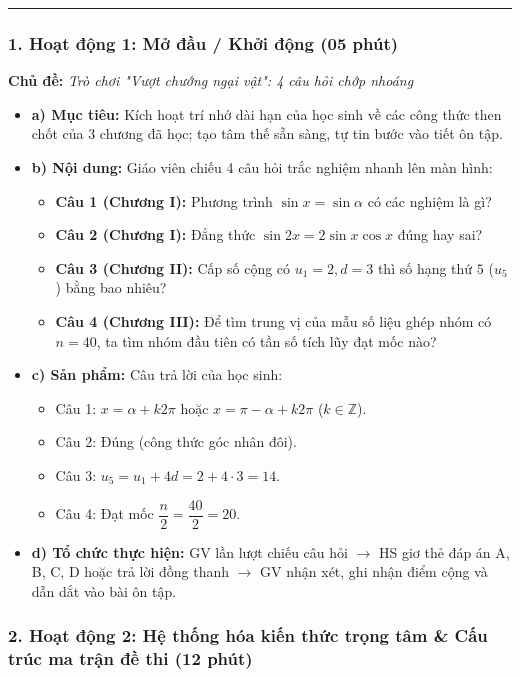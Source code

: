 \documentclass[12pt, a4paper]{article}
\begin{document}
\vspace{0.8em}
\hrule
\vspace{0.8em}

\subsubsection*{1. Hoạt động 1: Mở đầu / Khởi động (05 phút)}
\textbf{Chủ đề:} \textit{Trò chơi "Vượt chướng ngại vật": 4 câu hỏi chớp nhoáng}
\begin{itemize}
    \item \textbf{a) Mục tiêu:} Kích hoạt trí nhớ dài hạn của học sinh về các công thức then chốt của 3 chương đã học; tạo tâm thế sẵn sàng, tự tin bước vào tiết ôn tập.
    \item \textbf{b) Nội dung:} Giáo viên chiếu 4 câu hỏi trắc nghiệm nhanh lên màn hình:
    \begin{itemize}
        \item \textbf{Câu 1 (Chương I):} Phương trình $\sin x = \sin \alpha$ có các nghiệm là gì?
        \item \textbf{Câu 2 (Chương I):} Đẳng thức $\sin 2x = 2\sin x \cos x$ đúng hay sai?
        \item \textbf{Câu 3 (Chương II):} Cấp số cộng có $u_1 = 2, d = 3$ thì số hạng thứ $5$ ($u_5$) bằng bao nhiêu?
        \item \textbf{Câu 4 (Chương III):} Để tìm trung vị của mẫu số liệu ghép nhóm có $n = 40$, ta tìm nhóm đầu tiên có tần số tích lũy đạt mốc nào?
    \end{itemize}
    \item \textbf{c) Sản phẩm:} Câu trả lời của học sinh:
    \begin{itemize}
        \item Câu 1: $x = \alpha + k2\pi$ hoặc $x = \pi - \alpha + k2\pi$ ($k \in \mathbb{Z}$).
        \item Câu 2: Đúng (công thức góc nhân đôi).
        \item Câu 3: $u_5 = u_1 + 4d = 2 + 4 \cdot 3 = 14$.
        \item Câu 4: Đạt mốc $\dfrac{n}{2} = \dfrac{40}{2} = 20$.
    \end{itemize}
    \item \textbf{d) Tổ chức thực hiện:} GV lần lượt chiếu câu hỏi $\to$ HS giơ thẻ đáp án A, B, C, D hoặc trả lời đồng thanh $\to$ GV nhận xét, ghi nhận điểm cộng và dẫn dắt vào bài ôn tập.
\end{itemize}

\subsubsection*{2. Hoạt động 2: Hệ thống hóa kiến thức trọng tâm \& Cấu trúc ma trận đề thi (12 phút)}
\end{document}

